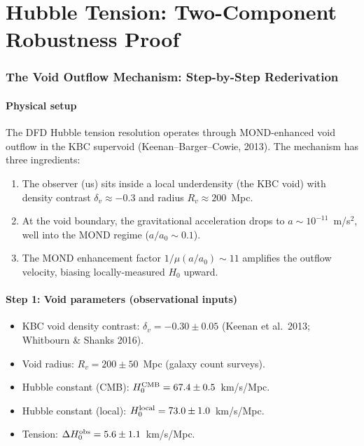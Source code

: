 \documentclass[11pt]{article}
\newcommand{\Hzero}{H_0}
\newcommand{\aM}{a_0}
\newcommand{\mufd}{\mu}
\begin{document}
\newpage

\part{Hubble Tension: Two-Component Robustness Proof}
\label{part:Hubble}

\section{The Void Outflow Mechanism: Step-by-Step Rederivation}
\label{sec:Hubble-rederive}

\subsection{Physical setup}

The DFD Hubble tension resolution operates through MOND-enhanced
void outflow in the KBC supervoid (Keenan--Barger--Cowie, 2013).
The mechanism has three ingredients:

\begin{enumerate}
\item The observer (us) sits inside a local underdensity (the KBC void)
  with density contrast $\delta_v \approx -0.3$ and radius
  $R_v \approx 200$~Mpc.
\item At the void boundary, the gravitational acceleration drops to
  $a \sim 10^{-11}$~m/s$^2$, well into the MOND regime
  ($a/\aM \sim 0.1$).
\item The MOND enhancement factor $1/\mufd(a/\aM) \sim 11$ amplifies
  the outflow velocity, biasing locally-measured $\Hzero$ upward.
\end{enumerate}

\subsection{Step 1: Void parameters (observational inputs)}

\begin{itemize}[nosep]
\item KBC void density contrast: $\delta_v = -0.30 \pm 0.05$ (Keenan
  et al.\ 2013; Whitbourn \& Shanks 2016).
\item Void radius: $R_v = 200 \pm 50$~Mpc (galaxy count surveys).
\item Hubble constant (CMB): $\Hzero^{\rm CMB} = 67.4 \pm 0.5$~km/s/Mpc.
\item Hubble constant (local): $\Hzero^{\rm local} = 73.0 \pm 1.0$~km/s/Mpc.
\item Tension: $\Delta\Hzero^{\rm obs} = 5.6 \pm 1.1$~km/s/Mpc.
\end{itemize}
\end{document}
